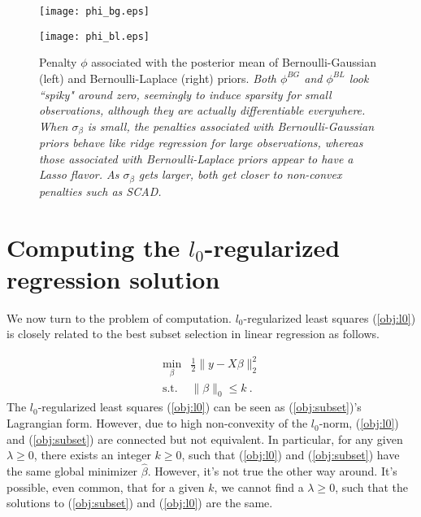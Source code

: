 \documentclass[11pt]{article}%
\numberwithin{equation}{section}
\theoremstyle{plain}
\begin{document}
\begin{figure}[!htb]
\centering
   \begin{minipage}{0.49\textwidth}
     \texttt{[image: phi\_bg.eps]}
   \end{minipage}
   \begin {minipage}{0.49\textwidth}
     \texttt{[image: phi\_bl.eps]}
   \end{minipage}
  \caption{Penalty $\phi$ associated with the posterior mean of Bernoulli-Gaussian (left) and Bernoulli-Laplace (right) priors.  \textit{Both $\phi^{BG}$ and $\phi^{BL}$ look ``spiky" around zero, seemingly to induce sparsity for small observations, although they are actually differentiable everywhere.  When $\sigma_\beta$ is small, the penalties associated with Bernoulli-Gaussian priors behave like ridge regression for large observations, whereas those associated with Bernoulli-Laplace priors appear to have a Lasso flavor.  As $\sigma_\beta$ gets larger, both get closer to non-convex penalties such as SCAD.}}
\label{fig:phi}
\end{figure}


\section{Computing the $l_0$-regularized regression solution \label{survey}}

We now turn to the problem of computation.  $l_0$-regularized least squares (\ref{obj:l0}) is closely related to the best subset selection in linear regression as follows.

\begin{equation}
  \label{obj:subset}
  \begin{array}{rl}
\min\limits_{\beta} & \frac12\|y - X\beta\|_2^2\\
\text{s.t.} & \|\beta\|_0 \leq k \ .
  \end{array}
\end{equation}
The $l_0$-regularized least squares (\ref{obj:l0}) can be seen as (\ref{obj:subset})'s Lagrangian form.  However, due to high non-convexity of the $l_0$-norm, (\ref{obj:l0}) and (\ref{obj:subset}) are connected but not equivalent.  In particular, for any given $\lambda \geq 0$, there exists an integer $k \geq 0$, such that (\ref{obj:l0}) and (\ref{obj:subset}) have the same global minimizer $\hat\beta$.  However, it's not true the other way around.  It's possible, even common, that for a given $k$, we cannot find a $\lambda \geq 0$, such that the solutions to (\ref{obj:subset}) and (\ref{obj:l0}) are the same.
\end{document}
